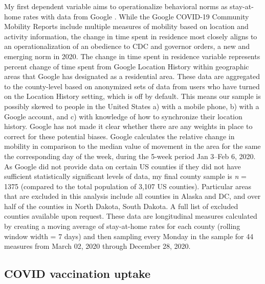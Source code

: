 My first dependent variable aims to operationalize behavioral norms as
stay-at-home rates with data from Google \citep{google2020}. While the Google
COVID-19 Community Mobility Reports include multiple measures of mobility based
on location and activity information, the change in time spent in residence
most closely aligns to an operationalization of an obedience to CDC and governor
orders, a new and emerging norm in 2020. The change in time spent in residence
variable represents percent change of time spent from Google Location History
within geographic areas that Google has designated as a residential area. These
data are aggregated to the county-level based on anonymized sets of data from
users who have turned on the Location History setting, which is off by default.
This means our sample is possibly skewed to people in the United States a) with
a mobile phone, b) with a Google account, and c) with knowledge of how to
synchronize their location history. Google has not made it clear whether there
are any weights in place to correct for these potential biases. Google
calculates the relative change in mobility in comparison to the median value of
movement in the area for the same the corresponding day of the week, during the
5-week period Jan 3--Feb 6, 2020. As Google did not provide data on certain US
counties if they did not have sufficient statistically significant levels of
data, my final county sample is \emph{n} = 1375
(compared to the total population of 3,107 US counties). Particular areas that
are excluded in this analysis include all counties in Alaska and DC, and over
half of the counties in North Dakota, South Dakota. A full list of excluded
counties available upon request. These data are longitudinal measures calculated
by creating a moving average of stay-at-home rates for each county (rolling
window width = 7 days) and then sampling every
Monday in the sample for 44 measures from March 02, 2020 through December 28,
2020.

\hypertarget{covid-vaccination-uptake}{%
\subsection{COVID vaccination uptake}\label{covid-vaccination-uptake}}



